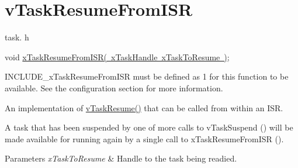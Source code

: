 \hypertarget{group__v_task_resume_from_i_s_r}{}\section{v\+Task\+Resume\+From\+I\+SR}
\label{group__v_task_resume_from_i_s_r}
task. h 
\begin{DoxyPre}void \mbox{\hyperlink{task_8h_ac75832334133fef12c7a35119a678dfc}{xTaskResumeFromISR( xTaskHandle xTaskToResume )}};\end{DoxyPre}


I\+N\+C\+L\+U\+D\+E\+\_\+x\+Task\+Resume\+From\+I\+SR must be defined as 1 for this function to be available. See the configuration section for more information.

An implementation of \mbox{\hyperlink{task_8h_a70d003c5360a01fa0f7f19859cc2d907}{v\+Task\+Resume()}} that can be called from within an I\+SR.

A task that has been suspended by one of more calls to v\+Task\+Suspend () will be made available for running again by a single call to x\+Task\+Resume\+From\+I\+SR ().


\begin{DoxyParams}{Parameters}
{\em x\+Task\+To\+Resume} & Handle to the task being readied. \\
\hline
\end{DoxyParams}
